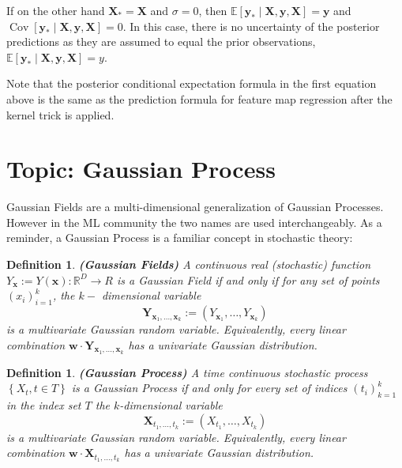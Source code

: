\documentclass[11pt]{article}
\theoremstyle{plain} %
\newtheorem{definition}[theorem]{Definition}
\theoremstyle{remark}
\begin{document}
If on the other hand $\mathbf{X}_{*}=\mathbf{X}$ and $\sigma=0$, then
$\mathbb{E}\left[\mathbf{y}_{*} \mid \mathbf{X}, \mathbf{y},
    \mathbf{X}\right]=\mathbf{y}$ and $\operatorname{Cov}\left[\mathbf{y}_{*} \mid
    \mathbf{X}, \mathbf{y}, \mathbf{X}\right]=0$. In this case, there is no uncertainty of the
posterior predictions as they are assumed to equal the prior observations,
$\mathbb{E}\left[\mathbf{y}_{*} \mid \mathbf{X}, \mathbf{y},
    \mathbf{X}\right]=y$.

Note that the posterior conditional expectation formula in the first equation
above is the same as the prediction formula for feature map regression after
the kernel trick is applied.

\section{Topic: Gaussian Process}

Gaussian Fields are a multi-dimensional generalization of Gaussian Processes.
However in the ML community the two names are used interchangeably. As a
reminder, a Gaussian Process is a familiar concept in stochastic theory:

\begin{definition}\textbf{(Gaussian Fields)}
  A continuous real (stochastic) function $Y_{\mathbf{x}}:=Y(\mathbf{x}):
    \mathbb{R}^{D} \rightarrow R$ is a Gaussian Field if and only if for any set of
  points $\left(x_{i}\right)_{i=1}^{k}$, the $k-$ dimensional variable
  $$
    \mathbf{Y}_{\mathbf{x}_{1}, \ldots, \mathbf{x}_{k}}:=\left(Y_{\mathbf{x}_{1}}, \ldots, Y_{\mathbf{x}_{k}}\right)
  $$
  is a multivariate Gaussian random variable. Equivalently, every linear
  combination $\mathbf{w} \cdot \mathbf{Y}_{\mathbf{x}_{1}, \ldots,
    \mathbf{x}_{k}}$ has a univariate Gaussian distribution.
\end{definition}

\begin{definition}\textbf{(Gaussian Process)}
  A time continuous stochastic process $\left\{X_{t}, t \in T\right\}$ is a
  Gaussian Process if and only for every set of indices
  $\left(t_{i}\right)_{k=1}^{k}$ in the index set $T$ the $k$-dimensional variable
  $$
    \mathbf{X}_{t_{1}, \ldots, t_{k}}:=\left(X_{t_{1}}, \ldots, X_{t_{k}}\right)
  $$
  is a multivariate Gaussian random variable. Equivalently, every linear
  combination $\mathbf{w} \cdot \mathbf{X}_{t_{1}, \ldots, t_{k}}$ has a
  univariate Gaussian distribution.
\end{definition}
\end{document}
